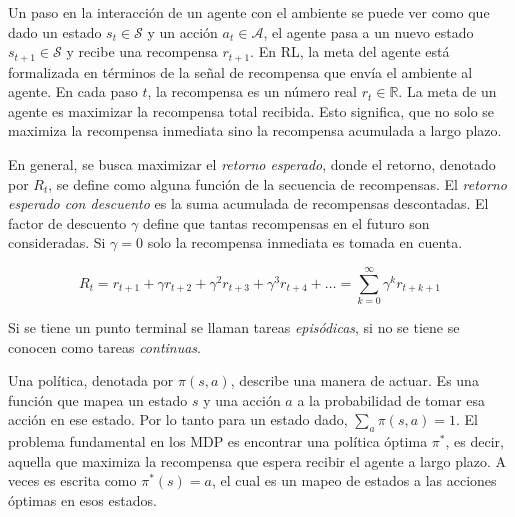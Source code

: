 

 Un paso en la interacción de un agente con el ambiente se puede ver como que dado un estado $s_t \in \mathcal{S}$ y un
acción $a_t\in \mathcal{A}$, el agente pasa a un nuevo
estado $s_{t+1} \in \mathcal{S}$ y recibe una recompensa
$r_{t+1}$.
En RL, la meta del agente está formalizada
en términos de la señal de recompensa que
envía el ambiente al agente. En cada paso $t$, la recompensa es un número real $r_t \in \mathbb{R}$. La meta de un agente
es maximizar la recompensa total recibida.
Esto significa, que no solo se maximiza la recompensa inmediata sino la recompensa acumulada a largo plazo.

En general, se busca maximizar el \textit{retorno
esperado}, donde el retorno, denotado por $R_t$, se define como alguna función de la secuencia de recompensas. 
El \textit{retorno esperado con descuento} es la suma acumulada de recompensas descontadas. El factor de descuento $\gamma$
define que tantas recompensas en el 
futuro son consideradas. Si $\gamma = 0$
solo la recompensa inmediata es
tomada en cuenta.

\[
R_t = r_{t+1} + \gamma r_{t+2} + \gamma^2 r_{t+3} + \gamma^3 r_{t+4} + \dots = 
\sum_{k = 0}^\infty \gamma^{k} r_{t+k+1}
\]

Si se tiene un punto terminal se llaman tareas \textit{episódicas}, si no se tiene se conocen como tareas \textit{continuas}.


Una política, denotada por $\pi(s, a)$, describe una manera de actuar. Es una función que mapea un estado $s$ y una acción $a$ a la probabilidad de tomar esa acción en ese estado.
Por lo tanto para un estado dado, 
$\sum_a \pi (s, a) = 1$. El problema fundamental en los MDP es encontrar una política óptima $\pi^*$, es decir, aquella que maximiza la recompensa que espera recibir el agente a largo plazo.
A veces es escrita como $\pi^*(s) = a$, el cual es un mapeo de estados a las acciones óptimas en esos estados.

